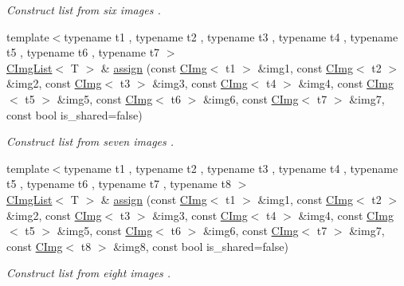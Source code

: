 \begin{DoxyCompactItemize}
\begin{DoxyCompactList}\small\item\em Construct list from six images . \end{DoxyCompactList}\item 
{\footnotesize template$<$typename t1 , typename t2 , typename t3 , typename t4 , typename t5 , typename t6 , typename t7 $>$ }\\\hyperlink{structcimg__library__suffixed_1_1CImgList}{C\+Img\+List}$<$ T $>$ \& \hyperlink{structcimg__library__suffixed_1_1CImgList_a2aaaeaedf65793e5c8c2dcfec80db12d}{assign} (const \hyperlink{structcimg__library__suffixed_1_1CImg}{C\+Img}$<$ t1 $>$ \&img1, const \hyperlink{structcimg__library__suffixed_1_1CImg}{C\+Img}$<$ t2 $>$ \&img2, const \hyperlink{structcimg__library__suffixed_1_1CImg}{C\+Img}$<$ t3 $>$ \&img3, const \hyperlink{structcimg__library__suffixed_1_1CImg}{C\+Img}$<$ t4 $>$ \&img4, const \hyperlink{structcimg__library__suffixed_1_1CImg}{C\+Img}$<$ t5 $>$ \&img5, const \hyperlink{structcimg__library__suffixed_1_1CImg}{C\+Img}$<$ t6 $>$ \&img6, const \hyperlink{structcimg__library__suffixed_1_1CImg}{C\+Img}$<$ t7 $>$ \&img7, const bool is\+\_\+shared=false)
\begin{DoxyCompactList}\small\item\em Construct list from seven images . \end{DoxyCompactList}\item 
{\footnotesize template$<$typename t1 , typename t2 , typename t3 , typename t4 , typename t5 , typename t6 , typename t7 , typename t8 $>$ }\\\hyperlink{structcimg__library__suffixed_1_1CImgList}{C\+Img\+List}$<$ T $>$ \& \hyperlink{structcimg__library__suffixed_1_1CImgList_aa45ecbaeb291ea1da01065d5b6c94b90}{assign} (const \hyperlink{structcimg__library__suffixed_1_1CImg}{C\+Img}$<$ t1 $>$ \&img1, const \hyperlink{structcimg__library__suffixed_1_1CImg}{C\+Img}$<$ t2 $>$ \&img2, const \hyperlink{structcimg__library__suffixed_1_1CImg}{C\+Img}$<$ t3 $>$ \&img3, const \hyperlink{structcimg__library__suffixed_1_1CImg}{C\+Img}$<$ t4 $>$ \&img4, const \hyperlink{structcimg__library__suffixed_1_1CImg}{C\+Img}$<$ t5 $>$ \&img5, const \hyperlink{structcimg__library__suffixed_1_1CImg}{C\+Img}$<$ t6 $>$ \&img6, const \hyperlink{structcimg__library__suffixed_1_1CImg}{C\+Img}$<$ t7 $>$ \&img7, const \hyperlink{structcimg__library__suffixed_1_1CImg}{C\+Img}$<$ t8 $>$ \&img8, const bool is\+\_\+shared=false)
\begin{DoxyCompactList}\small\item\em Construct list from eight images . \end{DoxyCompactList}\item 

\end{DoxyCompactItemize}
